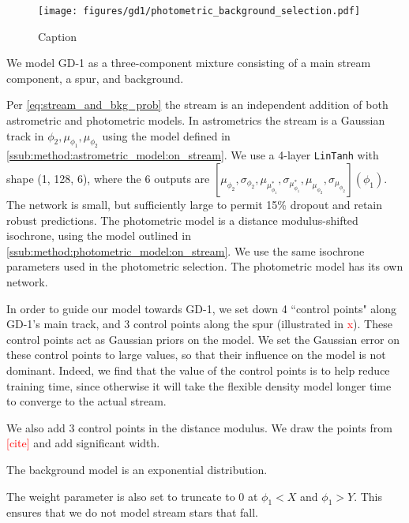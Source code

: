 \documentclass[twocolumn]{aastex631}
\newcommand{\TODO}[1]{{\textcolor{red}{#1}}}
\begin{document}
        \begin{figure}
            \centering
            \texttt{[image: figures/gd1/photometric\_background\_selection.pdf]}
            \caption{Caption}
            \label{fig:gd1-photometric_background_selection}
        \end{figure}

        We model GD-1 as a three-component mixture consisting of a main stream
        component, a spur, and background.

        Per \autoref{eq:stream_and_bkg_prob} the stream is an independent addition
        of both astrometric and photometric models.
        In astrometrics the stream is a Gaussian track in $\phi_2, \mu_{\phi_1}, \mu_{\phi_2}$
        using the model defined in \autoref{ssub:method:astrometric_model:on_stream}.
        We use a 4-layer \texttt{LinTanh} with shape (1, 128, 6), where the 6 outputs
        are $[\mu_{\phi_2}, \sigma_{\phi_2}, \mu_{\mu_{\phi_1}^*}, \sigma_{\mu_{\phi_1}^*}, \mu_{\mu_{\phi_2}}, \sigma_{\mu_{\phi_2}}](\phi_1)$. The network
        is small, but sufficiently large to permit 15\% dropout and retain robust
        predictions. The photometric model is a distance modulus-shifted isochrone,
        using the model outlined in \autoref{ssub:method:photometric_model:on_stream}.
        We use the same isochrone parameters used in the photometric selection.
        The photometric model has its own network.

        In order to guide our model towards
        GD-1, we set down 4 ``control points" along GD-1's main track, and 3
        control points along the spur (illustrated in \TODO{x}). These control
        points act as Gaussian priors on the model. We set the Gaussian error on
        these control points to large values, so that their influence on the
        model is not dominant. Indeed, we find that the value of the control
        points is to help reduce training time, since otherwise it will take the
        flexible density model longer time to converge to the actual stream.

        We also add 3 control points in the distance modulus.
        We draw the points from \TODO{[cite]} and add significant width.

        The background model is an exponential distribution.
        

        The weight parameter is also set to truncate to $0$ at $\phi_1 < X$
        and $\phi_1 > Y$. This ensures that we do not model stream stars that fall.
\end{document}
